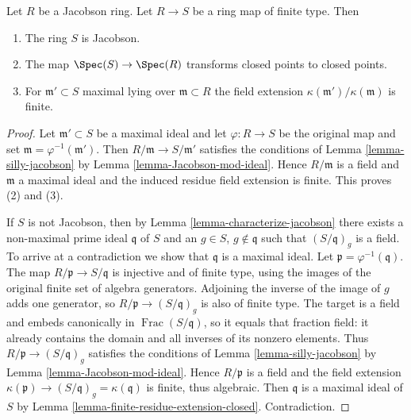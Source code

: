 \begin{proposition}
\label{proposition-Jacobson-permanence}
Let $R$ be a Jacobson ring. Let $R \to S$ be a
ring map of finite type. Then
\begin{enumerate}
\item The ring $S$ is Jacobson.
\item The map $\Spec(S) \to \Spec(R)$ transforms
closed points to closed points.
\item For $\mathfrak m' \subset S$ maximal lying over $\mathfrak m \subset R$
the field extension $\kappa(\mathfrak m')/\kappa(\mathfrak m)$
is finite.
\end{enumerate}
\end{proposition}

\begin{proof}
Let $\mathfrak m' \subset S$ be a maximal ideal and
let $\varphi:R\to S$ be the original map and set
$\mathfrak m=\varphi^{-1}(\mathfrak m')$.
Then $R/\mathfrak m \to S/\mathfrak m'$ satisfies
the conditions of Lemma \ref{lemma-silly-jacobson}
by Lemma \ref{lemma-Jacobson-mod-ideal}.
Hence $R/\mathfrak m$ is a field and
$\mathfrak m$ a maximal ideal and the induced
residue field extension is finite. This proves (2) and (3).  

\medskip\noindent
If $S$ is not Jacobson, then by Lemma \ref{lemma-characterize-jacobson} there
exists a non-maximal prime ideal $\mathfrak q$ of $S$ and an
$g \in S$, $g \not\in \mathfrak q$ such that $(S/\mathfrak q)_g$ is a field.
To arrive at a contradiction we show that $\mathfrak q$ is a maximal ideal.
Let $\mathfrak p=\varphi^{-1}(\mathfrak q)$.
The map $R/\mathfrak p\to S/\mathfrak q$ is injective and of finite
type, using the images of the original finite set of algebra generators.
Adjoining the inverse of the image of $g$ adds one generator, so
$R/\mathfrak p\to(S/\mathfrak q)_g$ is also of finite type.
The target is a field and embeds canonically in
$\operatorname{Frac}(S/\mathfrak q)$, so it equals that fraction
field: it already contains the domain and all inverses of its nonzero
elements. Thus
$R/\mathfrak p \to (S/\mathfrak q)_g$ satisfies the conditions of
Lemma \ref{lemma-silly-jacobson} by
Lemma \ref{lemma-Jacobson-mod-ideal}.
Hence $R/\mathfrak p$ is a field and the field extension
$\kappa(\mathfrak p) \to (S/\mathfrak q)_g = \kappa(\mathfrak q)$ is
finite, thus algebraic. Then $\mathfrak q$ is a maximal ideal of $S$ by
Lemma \ref{lemma-finite-residue-extension-closed}. Contradiction.
\end{proof}